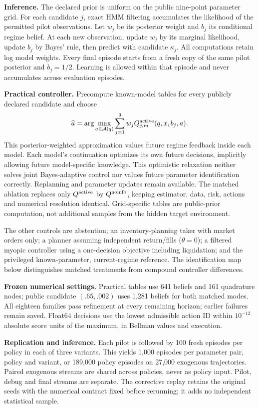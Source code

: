 \documentclass[11pt,a4paper]{article}
\begin{document}
\textbf{Inference.} The declared prior is uniform on the public nine-point parameter
grid. For each candidate $j$, exact HMM filtering accumulates the likelihood of
the permitted pilot observations. Let $w_j$ be its posterior weight and $b_j$ its
conditional regime belief. At each new observation, update $w_j$ by its marginal
likelihood, update $b_j$ by Bayes' rule, then predict with candidate $\kappa_j$.
All computations retain log model weights. Every final episode starts from a fresh
copy of the same pilot posterior and $b_j=1/2$. Learning is allowed within that
episode and never accumulates across evaluation episodes.

\textbf{Practical controller.} Precompute known-model tables for every publicly
declared candidate and choose
\[
\widehat a=\arg\max_{a\in\mathcal A(q)}\sum_{j=1}^9w_jQ^{\rm active}_{j,m}(q,x,b_j,a).
\]
This posterior-weighted approximation values future regime feedback inside each
model. Each model's continuation optimizes its own future decisions, implicitly
allowing future model-specific knowledge. This optimistic relaxation neither solves
joint Bayes-adaptive control nor values future parameter identification correctly.
Replanning and parameter updates remain available. The matched ablation replaces
only $Q^{\rm active}$ by $Q^{\rm noinfo}$, keeping estimator, data, risk, actions and
numerical resolution identical. Grid-specific tables are public-prior computation,
not additional samples from the hidden target environment.

The other controls are abstention; an inventory-planning taker with market orders
only; a planner assuming independent return/fills ($\theta=0$); a filtered myopic
controller using a one-decision objective including liquidation; and the privileged
known-parameter, current-regime reference. The identification map below distinguishes
matched treatments from compound controller differences.

\textbf{Frozen numerical settings.} Practical tables use 641 beliefs and 161
quadrature nodes; public candidate $(.65,.002)$ uses 1,281 beliefs for both matched
modes. All eighteen families pass refinement at every remaining horizon; earlier
failures remain saved. Float64 decisions use the lowest admissible action ID within
$10^{-12}$ absolute score units of the maximum, in Bellman values and execution.

\textbf{Replication and inference.} Each pilot is followed by 100 fresh episodes
per policy in each of three variants. This yields 1,000 episodes per parameter pair,
policy and variant, or 189,000 policy episodes on 27,000 exogenous trajectories.
Paired exogenous streams are
shared across policies, never as policy input. Pilot, debug and final streams are
separate. The corrective replay retains the original seeds with the numerical
contract fixed before rerunning; it adds no independent statistical sample.
\end{document}
